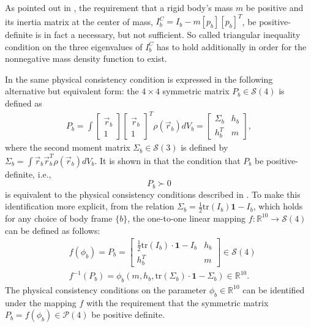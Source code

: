 \documentclass[Afour,sageh,times]{sagej}
\begin{document}
As pointed out in \cite{c1}, the requirement that a rigid body's mass $m$ be positive
and its inertia matrix at the center of mass, $I_{b}^{C}=I_{b}-m[p_{b}][p_{b}]^{T}$, be positive-definite is in fact a necessary, but not sufficient. So called triangular inequality condition on the three eigenvalues of $I_{b}^{C}$ has to hold additionally in order for the nonnegative mass density function to exist. 

In \cite{c2} the same physical consistency condition is expressed in the following
alternative but equivalent form: the $4 \times 4$ symmetric matrix $P_{b} \in \mathcal{S}(4)$ 
is defined as 
\begin{eqnarray}
P_{b} = \int \left[\begin{array}{c} \vec{r}_{b} \\ 1 \end{array}\right]
  \left[\begin{array}{c} \vec{r}_{b} \\ 1 \end{array}\right]^{T} \rho(\vec{r}_b) dV_{b} 
= \left[\begin{array}{cc} \Sigma_{b} & h_{b} \\ h_{b}^{T} & m \end{array}\right],
\label{44psd}
\end{eqnarray}
where the second moment matrix $\Sigma_{b}\in \mathcal{S}(3)$ is defined by
$\Sigma_{b} = \int \vec{r}_{b}\vec{r}_{b}^{T} \rho(\vec{r}_{b})dV_{b}$.  It is shown
in \cite{c2} that the condition that $P_b$ be positive-definite, i.e.,
\begin{equation}
P_b \succ 0
\label{full_cond_44psd}
\end{equation}
is equivalent to the physical consistency conditions described in \cite{c1}.
To make this identification more explicit, from the relation $\Sigma_{b}
= \frac{1}{2}\mathrm{tr}(I_{b})\mathbf{1} - I_{b}$, which holds for any choice of
body frame $\{b\}$, the one-to-one linear mapping $f : \mathbb{R}^{10}
\rightarrow \mathcal{S}(4)$ can be defined as follows:
\begin{align*}
&f(\phi_{b}) = P_{b} = \left[\begin{array}{cc} \frac{1}{2}\mathrm{tr}(I_{b})
\cdot\mathbf{1} - I_{b} & h_{b} \\ h_{b}^{T} & m\end{array}\right] \in \mathcal{S}(4)\\
&f^{-1}(P_{b}) = \phi_{b}(m, h_{b}, \mathrm{tr}(\Sigma_{b})\cdot\mathbf{1}
- \Sigma_{b}) \in \mathbb{R}^{10}.
\end{align*}
The physical consistency conditions on the  parameter $\phi_{b} \in \mathbb{R}^{10}$
can be identified under the mapping $f$ with the requirement that the symmetric matrix
$P_{b} = f(\phi_b) \in \mathcal{P}(4)$ be positive definite.
\end{document}

